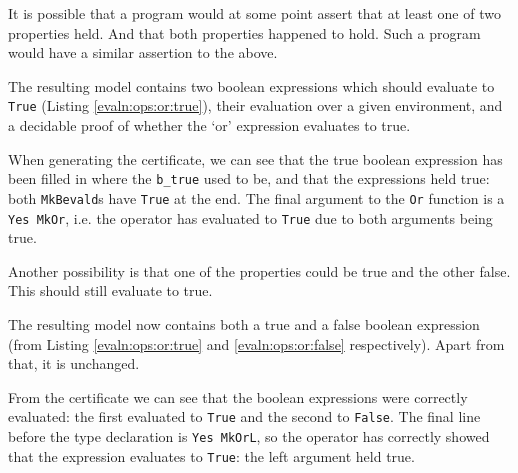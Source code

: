         
        
        It is possible that a program would at some point assert that at least one of two properties held. And that both properties happened to hold. Such a program would have a similar assertion to the above.
        
        \newpage
        
        
        The resulting \Idris model contains two boolean expressions which should evaluate to \texttt{True} (Listing \ref{evaln:ops:or:true}), their evaluation over a given environment, and a decidable proof of whether the `or' expression evaluates to true.
        
        
        When generating the certificate, we can see that the true boolean expression has been filled in where the \texttt{b\_true} used to be, and that the expressions held true: both \texttt{MkBevald}s have \texttt{True} at the end. The final argument to the \texttt{Or} function is a \texttt{Yes MkOr}, i.e. the operator has evaluated to \texttt{True} due to both arguments being true.
    
        
        
        Another possibility is that one of the properties could be true and the other false. This should still evaluate to true.
        
        
        The resulting model now contains both a true and a false boolean expression (from Listing \ref{evaln:ops:or:true} and \ref{evaln:ops:or:false} respectively). Apart from that, it is unchanged.
        
        \newpage
        
        
        From the certificate we can see that the boolean expressions were correctly evaluated: the first evaluated to \texttt{True} and the second to \texttt{False}. The final line before the type declaration is \texttt{Yes MkOrL}, so the operator has correctly showed that the expression evaluates to \texttt{True}: the left argument held true.
        
